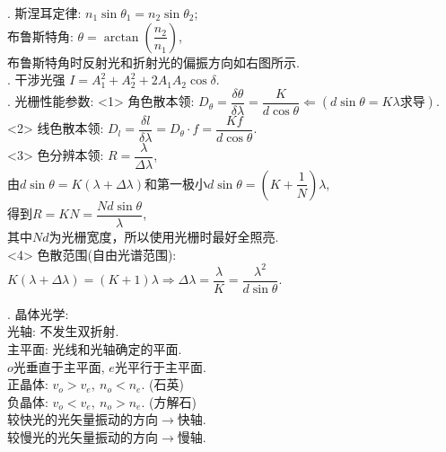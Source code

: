 \documentclass[12pt, 
]{article}
\begin{document}
. 斯涅耳定律: $n_1\sin\theta_1=n_2\sin\theta_2$;
~\\\phantom{~~~~~}布鲁斯特角: $\theta=\arctan\left(\dfrac{n_2}{n_1}\right)$,
~\\\phantom{~~~~~}布鲁斯特角时反射光和折射光的偏振方向如右图所示.
~\\

. 干涉光强 $I=A_1^2+A_2^2+2A_1A_2\cos\delta$.
~\\

. 光栅性能参数: <1> 角色散本领: $D_\theta=\dfrac{\delta\theta}{\delta\lambda}=\dfrac{K}{d\cos\theta}\Leftarrow(d\sin\theta=K\lambda\text{求导})$.
~\\\phantom{~~~~~光栅性能参数:~}<2> 线色散本领: $D_l=\dfrac{\delta l}{\delta\lambda}=D_\theta\cdot f=\dfrac{Kf}{d\cos\theta}$.
~\\\phantom{~~~~~光栅性能参数:~}<3> 色分辨本领: $R=\dfrac{\lambda}{\Delta\lambda}$,
~\\\phantom{~~~~~光栅性能参数:~<3>~}由$d\sin\theta=K(\lambda+\Delta\lambda)$和第一极小$d\sin\theta=(K+\dfrac{1}{N})\lambda$,
~\\\phantom{~~~~~光栅性能参数:~<3>~}得到$R=KN=\dfrac{Nd\sin\theta}{\lambda}$,
~\\\phantom{~~~~~光栅性能参数:~<3>~}其中$Nd$为光栅宽度，所以使用光栅时最好全照亮.
~\\\phantom{~~~~~光栅性能参数:~}<4> 色散范围(自由光谱范围):
~\\\phantom{~~~~~光栅性能参数:~<3>~}$K(\lambda+\Delta\lambda)=(K+1)\lambda\Rightarrow\Delta\lambda=\dfrac{\lambda}{K}=\dfrac{\lambda^2}{d\sin\theta}$.
~\\

\begin{figure}
\vspace{-0.8cm}
\hspace{-2.5cm}
\label{fg:13}
\end{figure}

. 晶体光学:
~\\\phantom{~~~~~}光轴: 不发生双折射.
~\\\phantom{~~~~~}主平面: 光线和光轴确定的平面.
~\\\phantom{~~~~~~~~~}$o$光垂直于主平面, $e$光平行于主平面.
~\\\phantom{~~~~~}正晶体: $v_o>v_e,~n_o<n_e$. (石英)
~\\\phantom{~~~~~}负晶体: $v_o<v_e,~n_o>n_e$. (方解石)
~\\\phantom{~~~~~}较快光的光矢量振动的方向$\rightarrow$快轴.
~\\\phantom{~~~~~}较慢光的光矢量振动的方向$\rightarrow$慢轴.
~\\
\end{document}
